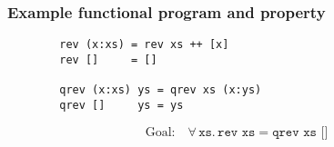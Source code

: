 \documentclass[serif,professionalfont]{beamer}
\newcommand\fa[1]{ \forall \, #1 . \,}
\newcommand\hs[1]{\texttt{#1}}
\newcommand\xs[0]{\hs{xs}}
\begin{document}
\begin{frame}[fragile]
  \frametitle{Example functional program and property}

    \begin{verbatim}
        rev (x:xs) = rev xs ++ [x]
        rev []     = []

        qrev (x:xs) ys = qrev xs (x:ys)
        qrev []     ys = ys
    \end{verbatim}

    \begin{equation*}
    \text{Goal:} \quad \fa{\xs} \hs{rev xs} = \hs{qrev xs []}
    \end{equation*}

%
%
%

\end{frame}

\end{document}
